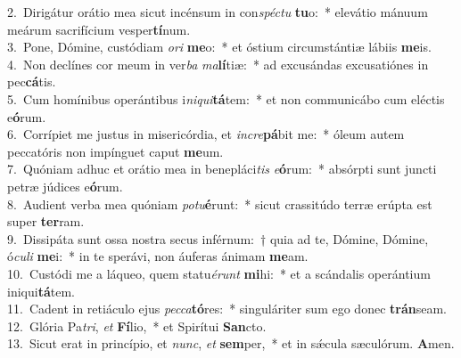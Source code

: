 {2.~}Dirigátur orátio mea sicut incénsum in con\textit{spé}\textit{ctu} \textbf{tu}o:~* elevátio mánuum meárum sacrifícium vesper\textbf{tí}num.\\
{3.~}Pone, Dómine, custódiam \textit{o}\textit{ri} \textbf{me}o:~* et óstium circumstántiæ lábiis \textbf{me}is.\\
{4.~}Non declínes cor meum in ver\textit{ba} \textit{ma}\textbf{lí}tiæ:~* ad excusándas excusatiónes in pec\textbf{cá}tis.\\
{5.~}Cum homínibus operántibus i\textit{ni}\textit{qui}\textbf{tá}tem:~* et non communicábo cum eléctis e\textbf{ó}rum.\\
{6.~}Corrípiet me justus in misericórdia, et \textit{in}\textit{cre}\textbf{pá}bit me:~* óleum autem peccatóris non impínguet caput \textbf{me}um.\\
{7.~}Quóniam adhuc et orátio mea in benepláci\textit{tis} \textit{e}\textbf{ó}rum:~* absórpti sunt juncti petræ júdices e\textbf{ó}rum.\\
{8.~}Audient verba mea quóniam \textit{po}\textit{tu}\textbf{é}runt:~* sicut crassitúdo terræ erúpta est super \textbf{ter}ram.\\
{9.~}Dissipáta sunt ossa nostra secus inférnum:~† quia ad te, Dómine, Dómine, ó\textit{cu}\textit{li} \textbf{me}i:~* in te sperávi, non áuferas ánimam \textbf{me}am.\\
{10.~}Custódi me a láqueo, quem statu\textit{é}\textit{runt} \textbf{mi}hi:~* et a scándalis operántium iniqui\textbf{tá}tem.\\
{11.~}Cadent in retiáculo ejus \textit{pec}\textit{ca}\textbf{tó}res:~* singuláriter sum ego donec \textbf{trán}seam.\\
{12.~}Glória Pa\textit{tri}, \textit{et} \textbf{Fí}lio,~* et Spirítui \textbf{San}cto.\\
{13.~}Sicut erat in princípio, et \textit{nunc}, \textit{et} \textbf{sem}per,~* et in sǽcula sæculórum. \textbf{A}men.\\

